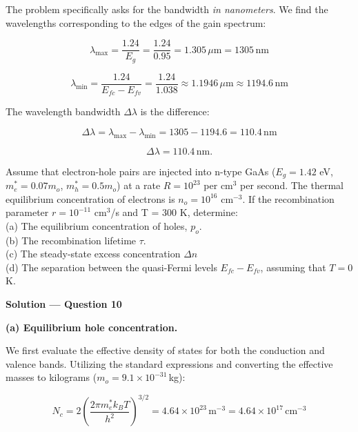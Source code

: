 The problem specifically asks for the bandwidth \emph{in nanometers}. We find the wavelengths corresponding to the edges of the gain spectrum:

\begin{equation*}
  \lambda_{\text{max}} = \frac{1.24}{E_g} = \frac{1.24}{0.95} = 1.305\,\mu\text{m} = 1305\,\text{nm}
\end{equation*}

\begin{equation*}
  \lambda_{\text{min}} = \frac{1.24}{E_{fc} - E_{fv}} = \frac{1.24}{1.038} \approx 1.1946\,\mu\text{m} \approx 1194.6\,\text{nm}
\end{equation*}

The wavelength bandwidth $\Delta \lambda$ is the difference:

\begin{equation*}
  \Delta \lambda = \lambda_{\text{max}} - \lambda_{\text{min}} = 1305 - 1194.6 = 110.4\,\text{nm}
\end{equation*}

\begin{equation*}
  \boxed{\Delta \lambda = 110.4\,\text{nm}.}
\end{equation*}

\begin{question}[Question 10]
Assume that electron-hole pairs are injected into n-type GaAs ($E_g = 1.42$ eV, $m_e^* = 0.07 m_o$, $m_h^* = 0.5 m_o$) at a rate $R = 10^{23}$ per cm$^3$ per second. The thermal equilibrium concentration of electrons is $n_o = 10^{16}$ cm$^{-3}$. If the recombination parameter $r = 10^{-11}$ cm$^3$/s and T = 300 K, determine:\\
(a) The equilibrium concentration of holes, $p_o$.\\
(b) The recombination lifetime $\tau$.\\
(c) The steady-state excess concentration $\Delta n$\\
(d) The separation between the quasi-Fermi levels $E_{fc} - E_{fv}$, assuming that $T = 0$ K.
\end{question}

\textbf{\large Solution --- Question 10}

\textbf{(a) Equilibrium hole concentration.}

We first evaluate the effective density of states for both the conduction and valence bands. Utilizing the standard expressions and converting the effective masses to kilograms ($m_o = 9.1 \times 10^{-31}$\,kg):

\begin{equation*}
  N_c = 2 \left( \frac{2\pi m_e^* k_B T}{h^2} \right)^{3/2} = 4.64 \times 10^{23}\,\text{m}^{-3} = 4.64 \times 10^{17}\,\text{cm}^{-3}
\end{equation*}

